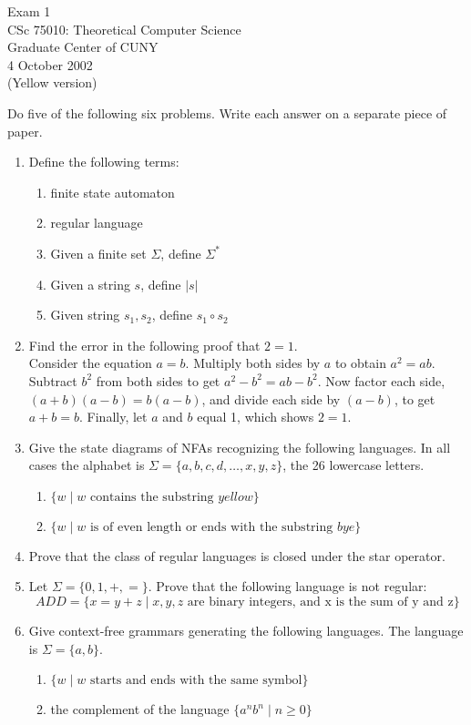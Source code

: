 \documentclass[11pt]{article}
\begin{document}
\begin{center}
	Exam 1\\
        	CSc 75010: Theoretical Computer Science\\
        	Graduate Center of CUNY\\
	4 October 2002\\
        	(Yellow version)
\end{center}

Do five of the following six problems.  Write each answer on a separate
piece of paper.


\begin{enumerate}
	\item Define the following terms:
     	   \begin{enumerate}
		\item finite state automaton
		\item regular language
		\item Given a finite set $\Sigma$, define $\Sigma^*$
		\item Given a string $s$, define $|s|$
		\item Given string $s_1, s_2$, define $s_1 \circ s_2$
	   \end{enumerate}
   	\item Find the error in the following proof that $2=1$.\\
		Consider the equation $a=b$.  Multiply both sides by $a$ to obtain $a^2 = ab$.
		Subtract $b^2$ from both sides to get $a^2-b^2 = ab-b^2$.  Now factor each 
		side, $(a+b)(a-b) = b(a-b)$, and divide each side by $(a-b)$, to get $a+b=b$.
		Finally, let $a$ and $b$ equal 1, which shows $2=1$.
   	\item Give the state diagrams of NFAs recognizing the following languages.  In all
	    cases the alphabet is $\Sigma = \{a,b,c,d,\ldots,x,y,z\}$, the 26 lowercase letters.
	    \begin{enumerate}
		\item $\{w \mid w \mbox{ contains the substring $yellow$}\}$
		\item $\{w \mid w \mbox{ is of even length or ends with the substring $bye$}\}$
	    \end{enumerate}
   	\item Prove that the class of regular languages is closed under the star operator.
   	\item Let $\Sigma = \{0,1,+,=\}$.   Prove that the following language is not regular:
		$$
			ADD = \{ x=y+z \mid x,y,z \mbox{ are binary integers, and x is the sum of y and z} \}
		$$
   	\item Give context-free grammars generating the following languages.  The language
		is $\Sigma = \{a,b\}$.
	  \begin{enumerate}
		\item $\{w \mid \mbox{$w$ starts and ends with the same symbol}\}$
		\item the complement of the language $\{a^n b^n \mid n\geq 0\}$
	  \end{enumerate}

\end{enumerate}



 
\end{document}
